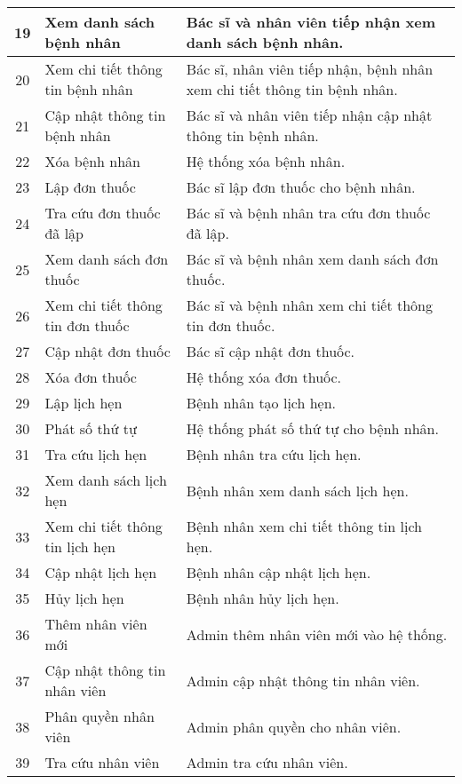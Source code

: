 \begin{longtable}{|c|p{4cm}|p{8cm}|}
    \hline
    19 & Xem danh sách bệnh nhân & Bác sĩ và nhân viên tiếp nhận xem danh sách bệnh nhân. \\
    \hline
    20 & Xem chi tiết thông tin bệnh nhân & Bác sĩ, nhân viên tiếp nhận, bệnh nhân xem chi tiết thông tin bệnh nhân. \\
    \hline
    21 & Cập nhật thông tin bệnh nhân & Bác sĩ và nhân viên tiếp nhận cập nhật thông tin bệnh nhân. \\
    \hline
    22 & Xóa bệnh nhân & Hệ thống xóa bệnh nhân. \\
    \hline
    23 & Lập đơn thuốc & Bác sĩ lập đơn thuốc cho bệnh nhân. \\
    \hline
    24 & Tra cứu đơn thuốc đã lập & Bác sĩ và bệnh nhân tra cứu đơn thuốc đã lập. \\
    \hline
    25 & Xem danh sách đơn thuốc & Bác sĩ và bệnh nhân xem danh sách đơn thuốc. \\
    \hline
    26 & Xem chi tiết thông tin đơn thuốc & Bác sĩ và bệnh nhân xem chi tiết thông tin đơn thuốc. \\
    \hline
    27 & Cập nhật đơn thuốc & Bác sĩ cập nhật đơn thuốc. \\
    \hline
    28 & Xóa đơn thuốc & Hệ thống xóa đơn thuốc. \\
    \hline
    29 & Lập lịch hẹn & Bệnh nhân tạo lịch hẹn. \\
    \hline
    30 & Phát số thứ tự & Hệ thống phát số thứ tự cho bệnh nhân. \\
    \hline
    31 & Tra cứu lịch hẹn & Bệnh nhân tra cứu lịch hẹn. \\
    \hline
    32 & Xem danh sách lịch hẹn & Bệnh nhân xem danh sách lịch hẹn. \\
    \hline
    33 & Xem chi tiết thông tin lịch hẹn & Bệnh nhân xem chi tiết thông tin lịch hẹn. \\
    \hline
    34 & Cập nhật lịch hẹn & Bệnh nhân cập nhật lịch hẹn. \\
    \hline
    35 & Hủy lịch hẹn & Bệnh nhân hủy lịch hẹn. \\
    \hline
    36 & Thêm nhân viên mới & Admin thêm nhân viên mới vào hệ thống. \\
    \hline
    37 & Cập nhật thông tin nhân viên & Admin cập nhật thông tin nhân viên. \\
    \hline
    38 & Phân quyền nhân viên & Admin phân quyền cho nhân viên. \\
    \hline
    39 & Tra cứu nhân viên & Admin tra cứu nhân viên. \\

\end{longtable}
